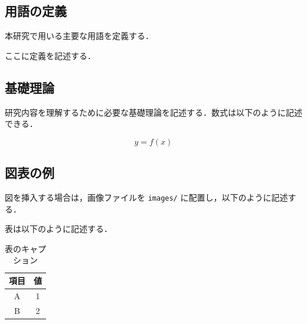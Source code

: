 \subsection{用語の定義}
本研究で用いる主要な用語を定義する．

\begin{defi}
ここに定義を記述する．
\end{defi}

\subsection{基礎理論}
研究内容を理解するために必要な基礎理論を記述する．数式は以下のように記述できる．

\begin{equation}
    y = f(x)
    \label{eq:sample}
\end{equation}

\subsection{図表の例}
図を挿入する場合は，画像ファイルを \texttt{images/} に配置し，以下のように記述する．


表は以下のように記述する．

\begin{table}[H]
    \centering
    \caption{表のキャプション}
    \label{tab:sample}
    \begin{tabular}{|c|c|} \hline
        項目 & 値 \\ \hline
        A & 1 \\ \hline
        B & 2 \\ \hline
    \end{tabular}
\end{table}


